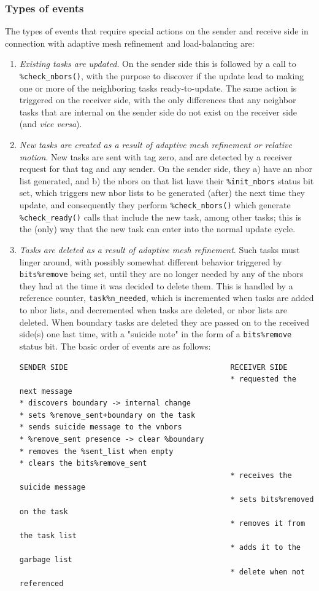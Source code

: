 \documentclass[paper=a4,fontsize=11pt]{scrartcl}
\numberwithin{equation}{section}		%
\numberwithin{figure}{section}			%
\numberwithin{table}{section}				%
\newcommand{\codecolor}{\color{Blue}}
\newcommand{\filecolor}{\color{NavyBlue}}
\newcommand{\Code}[1]{{\codecolor\texttt{#1}}}
\begin{document}
\subsubsection{Types of events}
The types of events that require special actions on the sender and receive side in connection with adaptive mesh refinement and load-balancing are:
\begin{enumerate}
    \item \textit{Existing tasks are updated}. On the sender side this is followed by a call to \Code{\%check\_nbors()}, with  the purpose to discover if the update lead to making one or more of the neighboring tasks ready-to-update.  The same action is triggered on the receiver side, with the only differences that any neighbor tasks that are internal on the sender side do not exist on the receiver side (and \textit{vice versa}).

    \item \textit{New tasks are created as a result of adaptive mesh refinement or relative motion}.  New tasks are sent with tag zero, and are detected by a receiver request for that tag and any sender.  On the sender side, they a) have an nbor list generated, and b) the nbors on that list have their \Code{\%init\_nbors} status bit set, which triggers new nbor lists to be generated (after) the next time they update, and consequently they perform \Code{\%check\_nbors()} which generate \Code{\%check\_ready()} calls that include the new task, among other tasks; this is the (only) way that the new task can enter into the normal update cycle.

    \item \textit{Tasks are deleted as a result of adaptive mesh refinement}.  Such tasks must linger around, with possibly somewhat different behavior triggered by \Code{bits\%remove} being set, until they are no longer needed by any of the nbors they had at the time it was decided to delete them.  This is handled by a reference counter, \Code{task\%n\_needed}, which is incremented when tasks are added to nbor lists, and decremented when tasks are deleted, or nbor lists are deleted.  When boundary tasks are deleted they are passed on to the received side(s) one last time, with a "suicide note" in the form of a \Code{bits\%remove} status bit.  The basic order of events are as follows:
{\filecolor \small \begin{verbatim}
SENDER SIDE                                     RECEIVER SIDE
                                                * requested the next message
* discovers boundary -> internal change
* sets %remove_sent+boundary on the task
* sends suicide message to the vnbors
* %remove_sent presence -> clear %boundary
* removes the %sent_list when empty
* clears the bits%remove_sent
                                                * receives the suicide message
                                                * sets bits%removed on the task
                                                * removes it from the task list
                                                * adds it to the garbage list
                                                * delete when not referenced
\end{verbatim}}


\end{enumerate}
\end{document}
